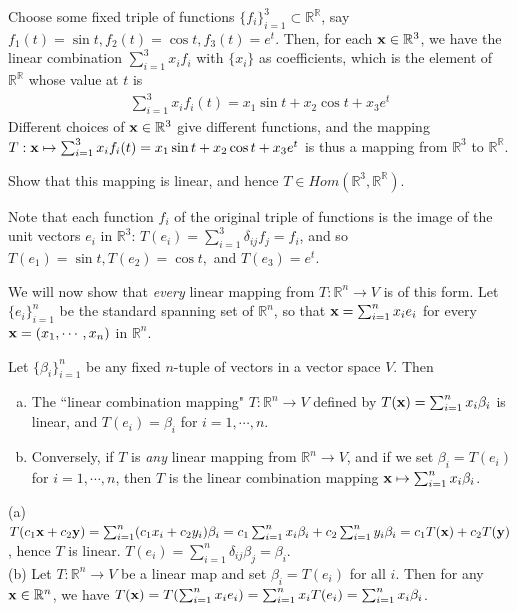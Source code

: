 \documentclass[12pt,letterpaper,reqno]{article}
\numberwithin{equation}{section}
\newcommand{\ti}[1]{\textit{#1}}
\begin{document}
\begin{example}
Choose some fixed triple of functions $\{f_i\}_{i=1}^3 \subset \mathbb{R}^\mathbb{R}$, say $f_1(t)=\sin t, f_2(t)=\cos t, f_3(t)=e^t$. Then, for each ${\bf x} \in \mathbb{R}^3$, we have the linear combination $\sum_{i=1}^3 x_i f_i$ with $\{x_i\}$ as coefficients, which is the element of $\mathbb{R}^\mathbb{R}$ whose value at $t$ is 
\begin{align*}
	\sum_{i=1}^3x_if_i(t)=x_1\sin t+x_2 \cos t + x_3 e^t
\end{align*}
Different choices of ${\bf x} \in \mathbb{R}^3$ give different functions, and the mapping $T:{\bf x} \mapsto \sum_{i=1}^3x_if_i(t)=x_1\sin t+x_2 \cos t + x_3 e^t$ is thus a mapping from $\mathbb{R}^3$ to $\mathbb{R}^\mathbb{R}$. 
\end{example}

\begin{exercise}
Show that this mapping is linear, and hence $T \in Hom(\mathbb{R}^3,\mathbb{R}^{\mathbb{R}})$.	
\end{exercise}

Note that each function $f_i$ of the original triple of functions is the image of the unit vectors $e_i$ in $\mathbb{R}^3$: $T(e_i)=\sum_{i=1}^3\delta_{ij}f_j=f_i$, and so $T(e_1)=\sin t, T(e_2)=\cos t,$ and $T(e_3)=e^t$.

We will now show that \ti{every} linear mapping from $T:\mathbb{R}^n \to V$ is of this form. Let $\{e_i\}_{i=1}^n$ be the standard spanning set of $\mathbb{R}^n$, so that ${\bf x}=\sum_{i=1}^nx_ie_i$ for every ${\bf x}=(x_1,\cdots,x_n)$ in $\mathbb{R}^n$.

\begin{thm}
Let $\{\beta_i\}_{i=1}^n$ be any fixed $n$-tuple of vectors in a vector space $V$. Then
\begin{enumerate}[(a)]
	\item The ``linear combination mapping" $T:\mathbb{R}^n \to V$ defined by $T({\bf x})=\sum_{i=1}^nx_i\beta_i$ is linear, and $T(e_i)=\beta_i$ for $i=1,\cdots,n$.
	\item Conversely, if $T$ is \emph{any} linear mapping from $\mathbb{R}^n \to V$, and if we set $\beta_i=T(e_i)$ for $i=1,\cdots, n$, then $T$ is the linear combination mapping ${\bf x} \mapsto \sum_{i=1}^nx_i\beta_i$. 
\end{enumerate}	
\end{thm}

\begin{pf}
(a)$T(c_1{\bf x}+c_2{\bf y})=\sum_{i=1}^n(c_1x_i+c_2y_i)\beta_i=c_1\sum_{i=1}^nx_i\beta_i+c_2\sum_{i=1}^ny_i\beta_i=c_1T({\bf x})+c_2T({\bf y})$, hence $T$ is linear. $T(e_i)=\sum_{i=1}^n\delta_{ij}\beta_j=\beta_i$. \\
(b) Let $T:\mathbb{R}^n \to V$ be a linear map and set $\beta_i=T(e_i)$ for all $i$. Then for any ${\bf x} \in \mathbb{R}^n$, we have $T({\bf x})=T(\sum_{i=1}^nx_ie_i)=\sum_{i=1}^nx_iT(e_i)=\sum_{i=1}^nx_i\beta_i$.	
\end{pf}
\end{document}
